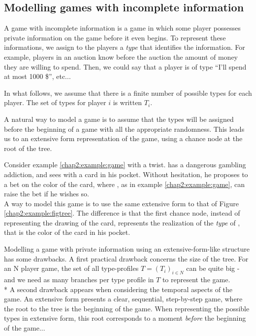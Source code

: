 \subsection{Modelling games with incomplete information}

A game with incomplete information is a game in which some player possesses private information on the game before it even begins. To represent these  informations, we assign to the players a \emph{type} that identifies the information. For example, players in an auction know before the auction the amount of money they are willing to spend. Then, we could say that a player is of type ``I'll spend at most 1000 \$'', etc...

 In what follows, we assume that there is a finite number of possible types for each player. The set of types for player $i$ is written $T_i$.

A natural way to model a game is to assume that the types will be assigned before the beginning of a game with all the appropriate randomness. This leads us to an extensive form representation of the game, using a chance node at the root of the tree.
\begin{example}
Consider example \ref{chap2:example:game} with a twist. \TAone{} has a dangerous gambling addiction, and sees \TAtwo{} with a card in his pocket.  Without hesitation, he proposes to \TAtwo{} a bet on the color of the card, where \TAtwo{}, as in example \ref{chap2:example:game}, can raise the bet if he wishes so.\\
A way to model this game is to use the same extensive form to that of Figure \ref{chap2:example:figtree}. The difference is that the first chance node, instead of representing the drawing of the card, represents the realization of the \emph{type} of \TAtwo{}, that is the color of the card in his pocket.
\label{ch2:exbayintro}
\end{example}

Modelling a game with private information using an extensive-form-like structure has some drawbacks. 
A first practical drawback concerns the size of the tree. For an N player game, the set of all type-profiles $T = (T_i)_{i \in N}$ can be quite big - and we need as many branches per type profile in $T$ to represent the game. \\*
A second drawback appears when considering the temporal aspects of the game.
An extensive form presents a clear, sequential, step-by-step game, where the root to the tree is the beginning of the game. When representing the possible types in extensive form, this root corresponds to a moment \emph{before} the beginning of the game...

